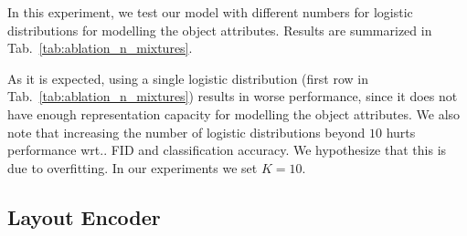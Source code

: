 \documentclass{article}
\makeatletter
\DeclareRobustCommand\onedot{\futurelet\@let@token\@onedot}
\def\@onedot{\ifx\@let@token.\else.\null\fi\xspace}
\def\wrt{wrt\onedot}
\newcommand{\tabref}[1]{Tab.~\ref{#1}}
\makeatother
\begin{document}
In this experiment, we test our model with different numbers for logistic distributions for
modelling the object attributes. Results are summarized in
\tabref{tab:ablation_n_mixtures}.
\begin{table}[!h]
    \centering
    \vspace{0.6em}
    \caption{{\bf Ablation Study on the Number of Logistic Distributions.} This
    table shows a quantitative comparison of our approach with different
    numbers of $K$ logistic distributions for modelling the size, the location
    and the orientation of each object.}
    \label{tab:ablation_n_mixtures}
    \vspace{-1.2em}
\end{table}


As it is expected, using a single logistic distribution (first row in
\tabref{tab:ablation_n_mixtures}) results in worse performance, since it
does not have enough representation capacity for modelling the object
attributes. We also note that increasing the number of logistic
distributions beyond $10$ hurts performance \wrt FID and
classification accuracy. We hypothesize that this is due to overfitting. In our
experiments we set $K=10$.

\subsection{Layout Encoder}
\label{subsec:layout_encoder}
\end{document}
